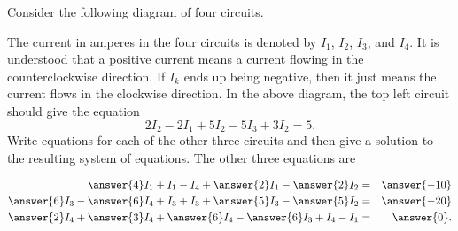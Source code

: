 \documentclass{ximera}
\author{Zack Reed}
\begin{document}
\begin{problem}

    Consider the following diagram of four circuits.
    \begin{center}
    \end{center}
    The current in amperes in the four circuits is denoted by $I_1$,
    $I_2$, $I_3$, and $I_4$. It is understood that a positive
    current means a current flowing in the counterclockwise direction. If
    $I_k$ ends up being negative, then it just means the current flows
    in the clockwise direction.  In the above diagram, the top left
    circuit should give the equation
    \begin{equation*}
      2I_2 - 2I_1+5I_2 - 5I_3+3I_2=5.
    \end{equation*}
    Write equations for each of the other three circuits and then give a solution
    to the resulting system of equations.
      The other three equations are
  
      \begin{eqnarray*}
        \answer{4}I_1 + I_1 - I_4 + \answer{2}I_1 - \answer{2}I_2 &=& \answer{-10} \\
        \answer{6}I_3 - \answer{6}I_4 + I_3 + I_3 + \answer{5}I_3 - \answer{5}I_2 &=& \answer{-20} \\
        \answer{2}I_4 + \answer{3}I_4 + \answer{6}I_4 - \answer{6}I_3 + I_4 - I_1 &=& \answer{0}.
      \end{eqnarray*}


\end{problem}
\end{document}
